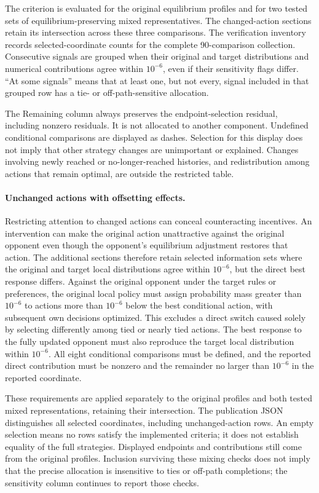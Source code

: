 The criterion is evaluated for the original equilibrium profiles and for two
tested sets of equilibrium-preserving mixed representatives. The
changed-action sections retain its intersection across these three comparisons.
The verification inventory records selected-coordinate counts for the complete
90-comparison collection. Consecutive signals are grouped
when their original and target distributions and numerical contributions agree
within $10^{-6}$, even if their sensitivity flags differ. ``At some signals''
means that at least one, but not every, signal included in that grouped row has
a tie- or off-path-sensitive allocation.

The Remaining column always preserves the endpoint-selection residual, including
nonzero residuals. It is not allocated to another component. Undefined conditional
comparisons are displayed as dashes. Selection for this display does not imply that other
strategy changes are unimportant or explained. Changes involving newly reached
or no-longer-reached histories, and redistribution among actions that remain
optimal, are outside the restricted table.

\paragraph{Unchanged actions with offsetting effects.}
Restricting attention to changed actions can conceal counteracting incentives.
An intervention can make the original action unattractive against the original
opponent even though the opponent's equilibrium adjustment restores that action.
The additional sections therefore retain selected information sets where the
original and target local distributions agree within $10^{-6}$, but the direct
best response differs. Against the original opponent under the target rules or
preferences, the original local policy must assign probability mass greater
than $10^{-6}$ to actions more than $10^{-6}$ below the best conditional action,
with subsequent own decisions optimized. This excludes a direct switch caused
solely by selecting differently among tied or nearly tied actions. The best
response to the fully updated opponent must also reproduce the target local
distribution within $10^{-6}$. All eight conditional comparisons must be defined,
and the reported direct contribution must be nonzero and the remainder no
larger than $10^{-6}$ in the reported coordinate.

These requirements are applied separately to the original profiles and both
tested mixed representations, retaining their intersection. The publication
JSON distinguishes all selected coordinates, including unchanged-action rows.
An empty selection means no rows satisfy the implemented criteria; it does not
establish equality of the full strategies. Displayed endpoints and contributions
still come from the original profiles. Inclusion surviving these mixing checks
does not imply that the precise allocation is insensitive to ties or off-path
completions; the sensitivity column continues to report those checks.

